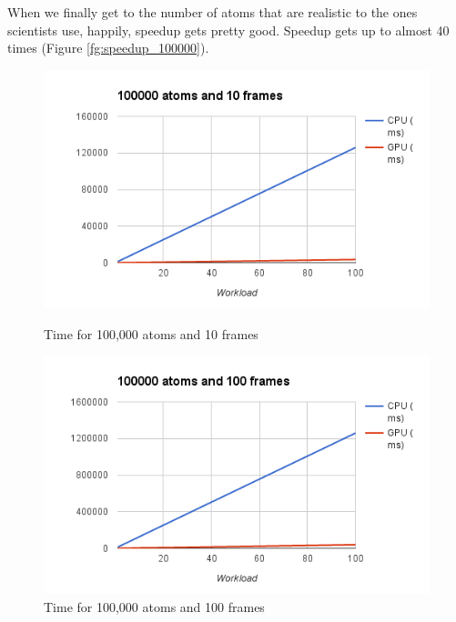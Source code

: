 \documentclass[12pt,letterpaper]{report}
\begin{document}
\hspace{3em} When we finally get to the number of atoms that are realistic to the ones scientists use, happily, speedup gets pretty good. Speedup gets up to almost 40 times (Figure \ref{fg:speedup_100000}).


\begin{figure}[!tbp]
  \centering
  \begin{minipage}[b]{0.4\textwidth}
    \includegraphics[width=\textwidth]{images/exp_100000_10}
    \caption{Time for 100,000 atoms and 10 frames}
    \label{fg:exp_100000_10}
  \end{minipage}
  \hfill
  \begin{minipage}[b]{0.4\textwidth}
    \includegraphics[width=\textwidth]{images/exp_100000_100}
    \caption{Time for 100,000 atoms and 100 frames}
     \label{fg:exp_100000_100}
  \end{minipage}
  \hfill
  \begin{minipage}[b]{0.4\textwidth}

\end{minipage}
\end{figure}
\end{document}
